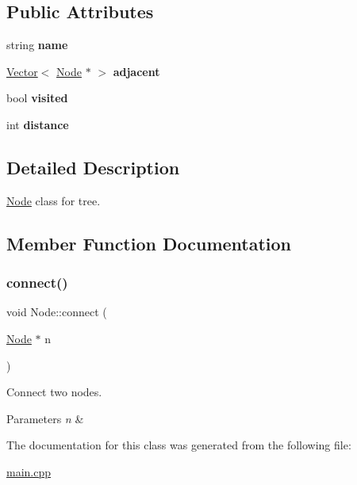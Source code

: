 \subsection*{Public Attributes}
\begin{DoxyCompactItemize}
\item 
\mbox{\label{classNode_a4cd656d544174479df27f0759e5a3997}} 
string {\bfseries name}
\item 
\mbox{\label{classNode_a33d398150241451968f5a08ee806a8d7}} 
\hyperlink{classVector}{Vector}$<$ \hyperlink{classNode}{Node} $\ast$ $>$ {\bfseries adjacent}
\item 
\mbox{\label{classNode_aa1bdec4e775fc578632e6a2dced9e251}} 
bool {\bfseries visited}
\item 
\mbox{\label{classNode_a420f57dad14f36839b73b16454f89608}} 
int {\bfseries distance}
\end{DoxyCompactItemize}


\subsection{Detailed Description}
\hyperlink{classNode}{Node} class for tree. 

\subsection{Member Function Documentation}
\mbox{\label{classNode_a527dac60fb4649415fc00fe81da91153}} 
\subsubsection{\texorpdfstring{connect()}{connect()}}
{\footnotesize\ttfamily void Node\+::connect (\begin{DoxyParamCaption}\item[{\hyperlink{classNode}{Node} $\ast$}]{n }\end{DoxyParamCaption})\hspace{0.3cm}{\ttfamily [inline]}}



Connect two nodes. 


\begin{DoxyParams}{Parameters}
{\em n} & \\
\hline
\end{DoxyParams}


The documentation for this class was generated from the following file\+:\begin{DoxyCompactItemize}
\item 
\hyperlink{main_8cpp}{main.\+cpp}\end{DoxyCompactItemize}
